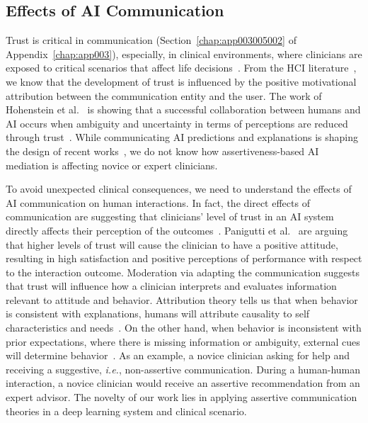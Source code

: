 \subsection{Effects of AI Communication}
\label{sec:app005003004}

Trust is critical in communication (Section~\ref{chap:app003005002} of Appendix~\ref{chap:app003}), especially, in clinical environments, where clinicians are exposed to critical scenarios that affect life decisions~\cite{Amann2020}.
From the \ac{HCI} literature~\cite{10.1145/3479587, 10.1145/3334480.3375147, 10.1145/3334480.3382842}, we know that the development of trust is influenced by the positive motivational attribution between the communication entity and the user.
The work of Hohenstein et al.~\cite{HOHENSTEIN2020106190} is showing that a successful collaboration between humans and \ac{AI} occurs when ambiguity and uncertainty in terms of perceptions are reduced through trust~\cite{HOHENSTEIN2020106190}.
While communicating \ac{AI} predictions and explanations is shaping the design of recent works~\cite{Lundberg2020, 10.1145/1518701.1518832}, we do not know how assertiveness-based \ac{AI} mediation is affecting novice or expert clinicians.

To avoid unexpected clinical consequences, we need to understand the effects of \ac{AI} communication on human interactions.
In fact, the direct effects of communication are suggesting that clinicians' level of trust in an \ac{AI} system directly affects their perception of the outcomes~\cite{HOHENSTEIN2020106190}.
Panigutti et al.~\cite{10.1145/3491102.3502104} are arguing that higher levels of trust will cause the clinician to have a positive attitude, resulting in high satisfaction and positive perceptions of performance with respect to the interaction outcome.
Moderation via adapting the communication suggests that trust will influence how a clinician interprets and evaluates information relevant to attitude and behavior.
Attribution theory tells us that when behavior is consistent with explanations, humans will attribute causality to self characteristics and needs~\cite{LOMBROZO2010303}.
On the other hand, when behavior is inconsistent with prior expectations, where there is missing information or ambiguity, external cues will determine behavior~\cite{HOHENSTEIN2020106190}.
As an example, a novice clinician asking for help and receiving a suggestive, {\it i.e.}, non-assertive communication.
During a human-human interaction, a novice clinician would receive an assertive recommendation from an expert advisor.
The novelty of our work lies in applying assertive communication theories in a deep learning system and clinical scenario.

